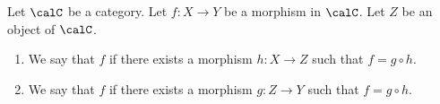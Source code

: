 \begin{definition} \label{definition:morphism_in_a_category_factoring_through_a_morphism}
    Let $\calC$ be a category. Let $f: X \to Y$ be a morphism in $\calC$. Let $Z$ be an object of $\calC$.
    \begin{enumerate}
        \item We say that $f$  if there exists a morphism $h: X \to Z$ such that $f = g \circ h$.
        \item We say that $f$  if there exists a morphism $g: Z \to Y$ such that $f = g \circ h$.
    \end{enumerate}
\end{definition}